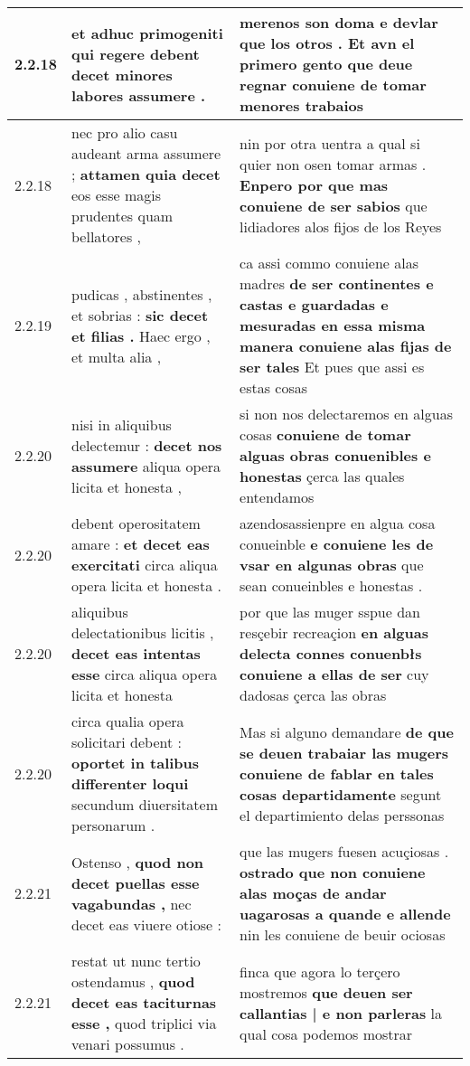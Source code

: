\begin{tabular}{|p{1cm}|p{6.5cm}|p{6.5cm}|}
2.2.18 & et adhuc primogeniti \textbf{ qui regere debent decet } minores labores assumere . & merenos son doma e devlar que los otros . \textbf{ Et avn el primero gento que deue regnar } conuiene de tomar menores trabaios \\\hline
2.2.18 & nec pro alio casu audeant arma assumere ; \textbf{ attamen quia decet } eos esse magis prudentes quam bellatores , & nin por otra uentra a qual si quier non osen tomar armas . \textbf{ Enpero por que mas conuiene de ser sabios } que lidiadores alos fijos de los Reyes \\\hline
2.2.19 & pudicas , abstinentes , et sobrias : \textbf{ sic decet et filias . } Haec ergo , et multa alia , & ca assi commo conuiene alas madres \textbf{ de ser continentes e castas e guardadas e mesuradas en essa misma manera conuiene alas fijas de ser tales } Et pues que assi es estas cosas \\\hline
2.2.20 & nisi in aliquibus delectemur : \textbf{ decet nos assumere } aliqua opera licita et honesta , & si non nos delectaremos en alguas cosas \textbf{ conuiene de tomar alguas obras conuenibles e honestas } çerca las quales entendamos \\\hline
2.2.20 & debent operositatem amare : \textbf{ et decet eas exercitati } circa aliqua opera licita et honesta . & azendosassienpre en algua cosa conueinble \textbf{ e conuiene les de vsar en algunas obras } que sean conueinbles e honestas . \\\hline
2.2.20 & aliquibus delectationibus licitis , \textbf{ decet eas intentas esse } circa aliqua opera licita et honesta & por que las muger sspue dan resçebir recreaçion \textbf{ en alguas delecta connes conuenbłs conuiene a ellas de ser } cuy dadosas çerca las obras \\\hline
2.2.20 & circa qualia opera solicitari debent : \textbf{ oportet in talibus differenter loqui } secundum diuersitatem personarum . & Mas si alguno demandare \textbf{ de que se deuen trabaiar las mugers conuiene de fablar en tales cosas departidamente } segunt el departimiento delas perssonas \\\hline
2.2.21 & Ostenso , \textbf{ quod non decet puellas esse vagabundas , } nec decet eas viuere otiose : & que las mugers fuesen acuçiosas . \textbf{ ostrado que non conuiene alas moças de andar uagarosas a quande e allende } nin les conuiene de beuir ociosas \\\hline
2.2.21 & restat ut nunc tertio ostendamus , \textbf{ quod decet eas taciturnas esse , } quod triplici via venari possumus . & finca que agora lo terçero mostremos \textbf{ que deuen ser callantias | e non parleras } la qual cosa podemos mostrar \\\hline

\end{tabular}
